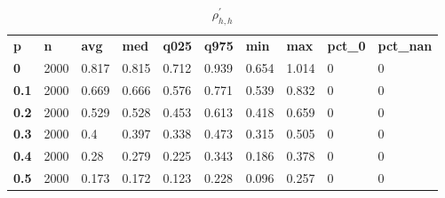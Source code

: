 \begin{table}[h]
 \centering 
\footnotesize
\caption{$\rho_{h,h}^\prime $}
\label{tab:alphahh}
\begin{tabular}[h]{| l l l l l l l l l l|
    } \hline
\textbf{ p} & \textbf{ n} & \textbf{ avg} & \textbf{ med} & \textbf{ q025} & \textbf{ q975} & \textbf{ min} & \textbf{ max} & \textbf{ pct\_0} & \textbf{ pct\_nan}
           \\
  \textbf{  0} & 2000 & 0.817 & 0.815 & 0.712 & 0.939 & 0.654 & 1.014 & 0 & 0
           \\
  \textbf{0.1} & 2000 & 0.669 & 0.666 & 0.576 & 0.771 & 0.539 & 0.832 & 0 & 0
           \\
  \textbf{0.2} & 2000 & 0.529 & 0.528 & 0.453 & 0.613 & 0.418 & 0.659 & 0 & 0
           \\
  \textbf{0.3} & 2000 &   0.4 & 0.397 & 0.338 & 0.473 & 0.315 & 0.505 & 0 & 0
           \\
  \textbf{0.4} & 2000 &  0.28 & 0.279 & 0.225 & 0.343 & 0.186 & 0.378 & 0 & 0
           \\
  \textbf{0.5} & 2000 & 0.173 & 0.172 & 0.123 & 0.228 & 0.096 & 0.257 & 0 & 0
           \\
 \hline \end{tabular}
 \end{table}

